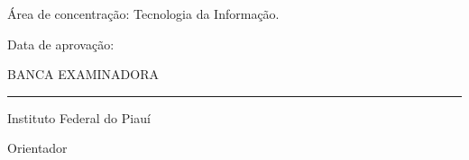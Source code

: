 
\begin{folhadeaprovacao}

\begin{center}

{\ABNTEXchapterfont\bfseries\imprimirautor}

\vspace{2cm}

{\ABNTEXchapterfont\bfseries\imprimirtitulo}

\vspace{2cm}

\end{center}

\begin{flushright}
	\begin{minipage}{8cm}
		{\normalsize\imprimirpreambulo}
				
	\end{minipage}
\end{flushright}





\vspace{0.5cm}

Área de concentração: Tecnologia da Informação.

\vspace{1cm}

{\normalsize Data de aprovação: \dataaprova}

\vspace{1cm}

\begin{center}
BANCA EXAMINADORA
\end{center}

\vspace{1cm}

\begin{center}

\rule{10cm}{0.4pt}
\par
\imprimirorientador

Instituto Federal do Piauí

Orientador


\end{center}
\end{folhadeaprovacao}
